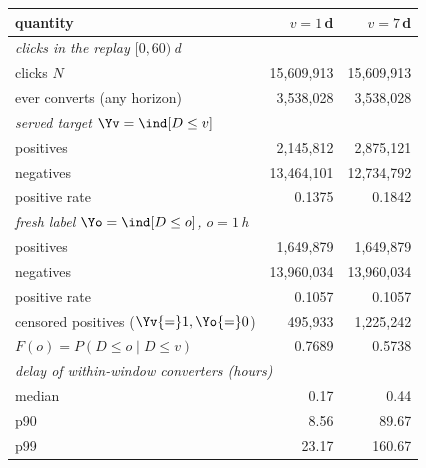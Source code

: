 \begin{tabular}{lrr}
\toprule
quantity & $v=1$\,d & $v=7$\,d\\
\midrule
\multicolumn{3}{l}{\emph{clicks in the replay $[0,60)$\,d}}\\
\quad clicks $N$ & 15,609,913 & 15,609,913\\
\quad ever converts (any horizon) & 3,538,028 & 3,538,028\\
\midrule\multicolumn{3}{l}{\emph{served target $\Yv=\ind[D\le v]$}}\\
\quad positives & 2,145,812 & 2,875,121\\
\quad negatives & 13,464,101 & 12,734,792\\
\quad positive rate & 0.1375 & 0.1842\\
\midrule\multicolumn{3}{l}{\emph{fresh label $\Yo=\ind[D\le o]$, $o=1$\,h}}\\
\quad positives & 1,649,879 & 1,649,879\\
\quad negatives & 13,960,034 & 13,960,034\\
\quad positive rate & 0.1057 & 0.1057\\
\quad censored positives ($\Yv{=}1,\Yo{=}0$) & 495,933 & 1,225,242\\
\quad $F(o)=P(D\le o\mid D\le v)$ & 0.7689 & 0.5738\\
\midrule\multicolumn{3}{l}{\emph{delay of within-window converters (hours)}}\\
\quad median & 0.17 & 0.44\\
\quad p90 & 8.56 & 89.67\\
\quad p99 & 23.17 & 160.67\\
\bottomrule
\end{tabular}
